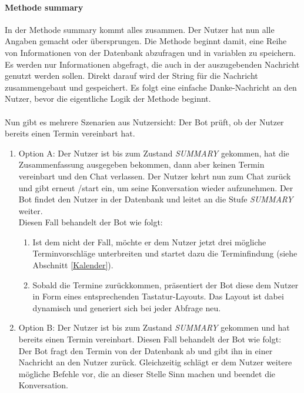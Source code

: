             \paragraph{Methode summary}
                In der Methode summary kommt alles zusammen. Der Nutzer hat nun alle Angaben gemacht oder übersprungen. Die Methode beginnt damit, eine Reihe von Informationen von der Datenbank abzufragen und in variablen zu speichern. Es werden nur Informationen abgefragt, die auch in der auszugebenden Nachricht genutzt werden sollen. Direkt darauf wird der String für die Nachricht zusammengebaut und gespeichert. Es folgt eine einfache Danke-Nachricht an den Nutzer, bevor die eigentliche Logik der Methode beginnt.\\
                \\
                Nun gibt es mehrere Szenarien aus Nutzersicht: Der Bot prüft, ob der Nutzer bereits einen Termin vereinbart hat.
                
                \begin{enumerate}
                \item Option A:  Der Nutzer ist bis zum Zustand \emph{SUMMARY} gekommen, hat die Zusammenfassung ausgegeben bekommen, dann aber keinen Termin vereinbart und den Chat verlassen. Der Nutzer kehrt nun zum Chat zurück und gibt erneut /start ein, um seine Konversation wieder aufzunehmen. Der Bot findet den Nutzer in der Datenbank und leitet an die Stufe \emph{SUMMARY} weiter. \\
                Diesen Fall behandelt der Bot wie folgt:
                    \begin{enumerate}
                        \item Ist dem nicht der Fall, möchte er dem Nutzer jetzt drei mögliche Terminvorschläge unterbreiten und startet dazu die Terminfindung (siehe Abschnitt \ref*{Kalender}). %
                        \item Sobald die Termine zurückkommen, präsentiert der Bot diese dem Nutzer in Form eines entsprechenden Tastatur-Layouts. Das Layout ist dabei dynamisch und generiert sich bei jeder Abfrage neu.
                    \end{enumerate}
                \item Option B: Der Nutzer ist bis zum Zustand \emph{SUMMARY} gekommen und hat bereits einen Termin vereinbart.
                Diesen Fall behandelt der Bot wie folgt:\\
                Der Bot fragt den Termin von der Datenbank ab und gibt ihn in einer Nachricht an den Nutzer zurück. Gleichzeitig schlägt er dem Nutzer weitere mögliche Befehle vor, die an dieser Stelle Sinn machen und beendet die Konversation.
                \end{enumerate}

